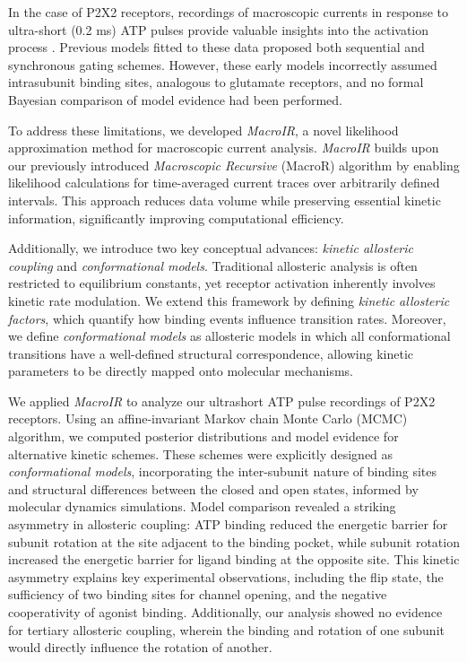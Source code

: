 \documentclass[pdflatex,sn-mathphys-num]{sn-jnl}%
\theoremstyle{thmstyleone}%
\theoremstyle{thmstyletwo}%
\theoremstyle{thmstylethree}%
\begin{document}
In the case of P2X2 receptors, recordings of macroscopic currents in response to ultra-short (0.2 ms) ATP pulses provide valuable insights into the activation process \cite{Moffatt_hume}. Previous models fitted to these data proposed both sequential and synchronous gating schemes. However, these early models incorrectly assumed intrasubunit binding sites, analogous to glutamate receptors, and no formal Bayesian comparison of model evidence had been performed.

To address these limitations, we developed \textit{MacroIR}, a novel likelihood approximation method for macroscopic current analysis. \textit{MacroIR} builds upon our previously introduced \textit{Macroscopic Recursive} (MacroR) algorithm by enabling likelihood calculations for time-averaged current traces over arbitrarily defined intervals. This approach reduces data volume while preserving essential kinetic information, significantly improving computational efficiency. 

Additionally, we introduce two key conceptual advances: \textit{kinetic allosteric coupling} and \textit{conformational models}. Traditional allosteric analysis is often restricted to equilibrium constants, yet receptor activation inherently involves kinetic rate modulation. We extend this framework by defining \textit{kinetic allosteric factors}, which quantify how binding events influence transition rates. Moreover, we define \textit{conformational models} as allosteric models in which all conformational transitions have a well-defined structural correspondence, allowing kinetic parameters to be directly mapped onto molecular mechanisms.

We applied \textit{MacroIR} to analyze our ultrashort ATP pulse recordings of P2X2 receptors. Using an affine-invariant Markov chain Monte Carlo (MCMC) algorithm, we computed posterior distributions and model evidence for alternative kinetic schemes. These schemes were explicitly designed as \textit{conformational models}, incorporating the inter-subunit nature of binding sites and structural differences between the closed and open states, informed by molecular dynamics simulations. Model comparison revealed a striking asymmetry in allosteric coupling: ATP binding reduced the energetic barrier for subunit rotation at the site adjacent to the binding pocket, while subunit rotation increased the energetic barrier for ligand binding at the opposite site. This kinetic asymmetry explains key experimental observations, including the flip state, the sufficiency of two binding sites for channel opening, and the negative cooperativity of agonist binding. Additionally, our analysis showed no evidence for tertiary allosteric coupling, wherein the binding and rotation of one subunit would directly influence the rotation of another.
\end{document}

